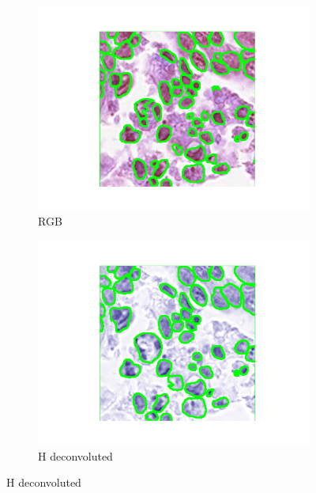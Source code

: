 \documentclass[target=bach,aauheader=,style=]{thud}
\begin{document}
\begin{figure}[!htbp]
\begin{subfigure}{0.48\textwidth}
  \centering
  \includegraphics[width=\linewidth]{imgs/qualitative/worst/RGB/contour_img.png}
  \caption{RGB}
\end{subfigure}\hfill
\begin{subfigure}{0.48\textwidth}
  \centering
  \includegraphics[width=\linewidth]{imgs/qualitative/worst/HE/contour_img.png}
  \caption{H deconvoluted}
\end{subfigure}


\end{figure}
\end{document}
